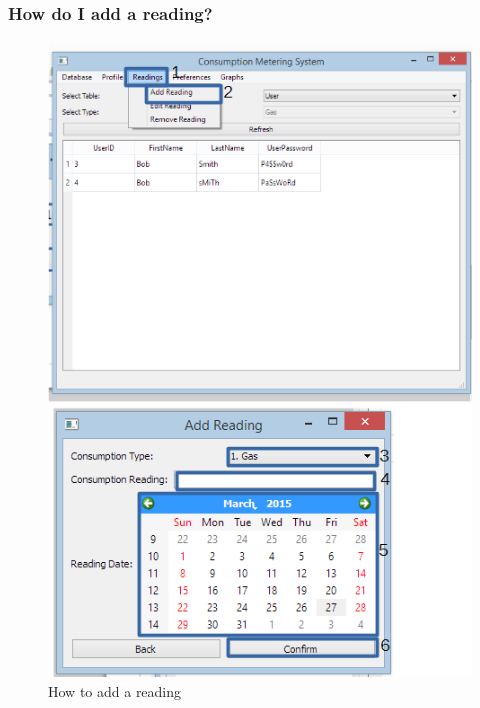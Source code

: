\subsubsection{How do I add a reading?}\label{question:add_reading}
\begin{figure}[H]
	\includegraphics{./manual/images/add_reading.png}
	\caption{How to add a reading}
\end{figure}

